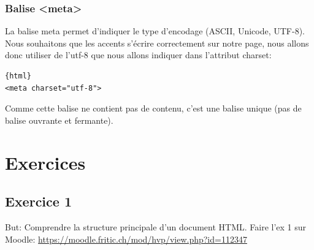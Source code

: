 \documentclass[a4paper,11pt]{article}
\begin{document}
\subsubsection{Balise <meta>}
La balise meta permet d'indiquer le type d'encodage (ASCII, Unicode, UTF-8). Nous souhaitons que les accents s'écrire correctement sur notre page, nous allons donc utiliser de l'utf-8 que nous allons indiquer dans l'attribut charset:
\begin{verbatim}{html}
<meta charset="utf-8">
\end{verbatim}
Comme cette balise ne contient pas de contenu, c'est une balise unique (pas de balise ouvrante et fermante).

\section{Exercices}
\subsection{Exercice 1}
But: Comprendre la structure principale d'un document HTML.
Faire l'ex 1 sur Moodle: \url{https://moodle.fritic.ch/mod/hvp/view.php?id=112347}
\end{document}
